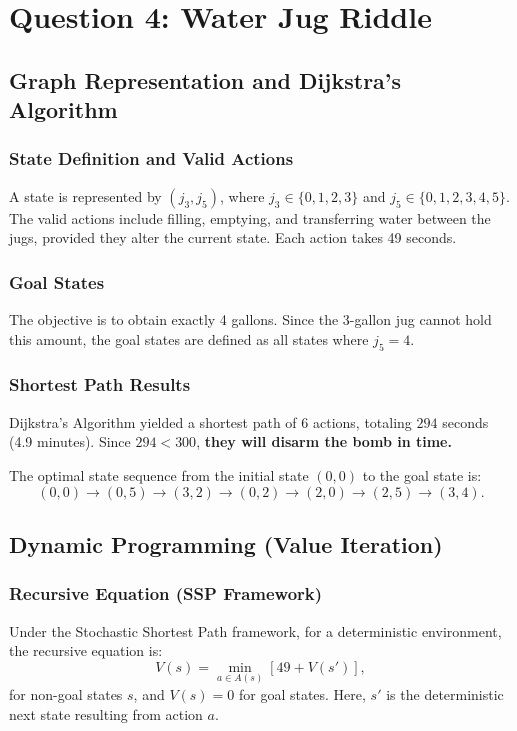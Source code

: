 \documentclass[11pt,a4paper]{article}
\begin{document}
\section*{Question 4: Water Jug Riddle}

\subsection*{Graph Representation and Dijkstra's Algorithm}

\subsubsection*{State Definition and Valid Actions}
A state is represented by $(j_3,j_5)$, where $j_3\in\{0,1,2,3\}$ and $j_5\in\{0,1,2,3,4,5\}$. 
The valid actions include filling, emptying, and transferring water between the jugs, provided they alter the current state. Each action takes 49 seconds. 

\subsubsection*{Goal States}
The objective is to obtain exactly 4 gallons. Since the 3-gallon jug cannot hold this amount, the goal states are defined as all states where $j_5 = 4$.

\subsubsection*{Shortest Path Results}
Dijkstra's Algorithm yielded a shortest path of $6$ actions, totaling $294$ seconds (4.9 minutes). Since $294 < 300$, \textbf{they will disarm the bomb in time.}

The optimal state sequence from the initial state $(0,0)$ to the goal state is:
\[
(0,0)\rightarrow(0,5)\rightarrow(3,2)\rightarrow(0,2)\rightarrow(2,0)\rightarrow(2,5)\rightarrow(3,4).
\]

\subsection*{Dynamic Programming (Value Iteration)}

\subsubsection*{Recursive Equation (SSP Framework)}
Under the Stochastic Shortest Path framework, for a deterministic environment, the recursive equation is:
\[
V(s)=\min_{a\in A(s)}\left[49 + V(s')\right],
\]
for non-goal states $s$, and $V(s)=0$ for goal states. Here, $s'$ is the deterministic next state resulting from action $a$.
\end{document}

